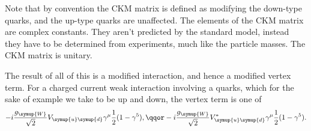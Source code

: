 \documentclass[fleqn]{NotesClass}
\newcommand{\Pparticle}[1]{\symup{#1}}
\newcommand{\Pu}{\ensuremath{\Pparticle{u}}}
\newcommand{\Pd}{\ensuremath{\Pparticle{d}}}
\newcommand{\PW}{\ensuremath{\Pparticle{W}}}
\begin{document}
    Note that by convention the CKM matrix is defined as modifying the down-type quarks, and the up-type quarks are unaffected.
    The elements of the CKM matrix are complex constants.
    They aren't predicted by the standard model, instead they have to be determined from experiments, much like the particle masses.
    The CKM matrix is unitary.
    
    The result of all of this is a modified interaction, and hence a modified vertex term.
    For a charged current weak interaction involving a quarks, which for the sake of example we take to be up and down, the vertex term is one of
    \begin{equation}
        -i \frac{g_{\PW}}{\sqrt{2}} V_{\Pu\Pd} \gamma^\mu \frac{1}{2}(1 - \gamma^5), \qqor -i\frac{g_{\PW}}{\sqrt{2}} V_{\Pu\Pd}^* \gamma^\mu \frac{1}{2}(1 - \gamma^5).
    \end{equation}
    
\end{document}
